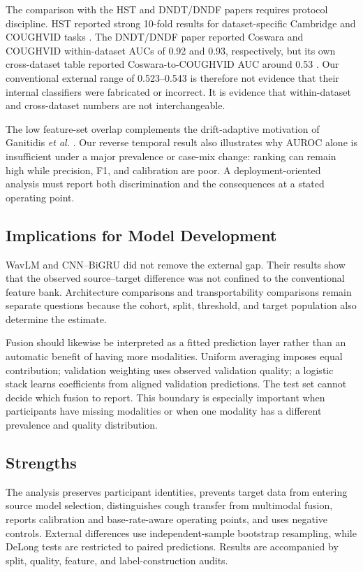 The comparison with the HST and DNDT/DNDF papers requires protocol discipline.
HST reported strong 10-fold results for dataset-specific Cambridge and
COUGHVID tasks \cite{aytekin2024hst}. The DNDT/DNDF paper reported Coswara and
COUGHVID within-dataset AUCs of 0.92 and 0.93, respectively, but its own
cross-dataset table reported Coswara-to-COUGHVID AUC around 0.53
\cite{islam2026robust}. Our conventional external range of 0.523--0.543 is
therefore not evidence that their internal classifiers were fabricated or
incorrect. It is evidence that within-dataset and cross-dataset numbers are not
interchangeable.

The low feature-set overlap complements the drift-adaptive motivation of
Ganitidis \emph{et al.} \cite{ganitidis2025drift}. Our reverse temporal result
also illustrates why AUROC alone is insufficient under a major prevalence or
case-mix change: ranking can remain high while precision, F1, and calibration
are poor. A deployment-oriented analysis must report both discrimination and
the consequences at a stated operating point.

\subsection{Implications for Model Development}

WavLM and CNN--BiGRU did not remove the external gap. Their results show that
the observed source--target difference was not confined to the conventional
feature bank. Architecture comparisons and transportability comparisons remain
separate questions because the cohort, split, threshold, and target population
also determine the estimate.

Fusion should likewise be interpreted as a fitted prediction layer rather than
an automatic benefit of having more modalities. Uniform averaging imposes
equal contribution; validation weighting uses observed validation quality; a
logistic stack learns coefficients from aligned validation predictions. The
test set cannot decide which fusion to report. This boundary is especially
important when participants have missing modalities or when one modality has a
different prevalence and quality distribution.

\subsection{Strengths}

The analysis preserves participant identities, prevents target data from
entering source model selection, distinguishes cough transfer from multimodal
fusion, reports calibration and base-rate-aware operating points, and uses
negative controls. External differences use independent-sample bootstrap
resampling, while DeLong tests are restricted to paired predictions. Results
are accompanied by split, quality, feature, and label-construction audits.


